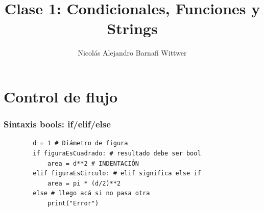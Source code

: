 \documentclass[14pt,aspectratio=169,xcolor=dvipsnames]{beamer}
\title[short title]{Clase 1: Condicionales, Funciones y Strings}
\subtitle{}
\author[NA Barnafi] {Nicolás Alejandro Barnafi Wittwer}
\institute[UC|CMM] 
{
    Pontificia Universidad Católica de Chile \\
    Centro de Modelamiento Matemático
}
\date{}
\begin{document}
\begin{frame}
    \maketitle
\end{frame}
\section{Control de flujo}
\begin{frame}[fragile]\frametitle{Sintaxis bools: if/elif/else}

    \begin{verbatim}
        d = 1 # Diámetro de figura
        if figuraEsCuadrado: # resultado debe ser bool
            area = d**2 # INDENTACIÓN
        elif figuraEsCirculo: # elif significa else if
            area = pi * (d/2)**2
        else # llego acá si no pasa otra
            print("Error")
    \end{verbatim}    
\end{frame}
\end{document}
